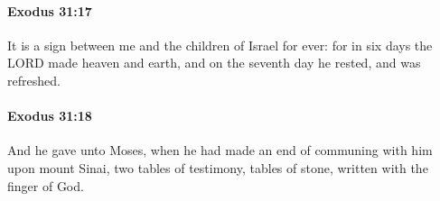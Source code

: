 		\paragraph{Exodus 31:17} %
			\label{EXODUS-31-17}

			It is a sign between me and the children of Israel for ever: for in six days the LORD made heaven and earth, and on the seventh day he rested, and was refreshed.


		\paragraph{Exodus 31:18} %
			\label{EXODUS-31-18}

			And he gave unto Moses, when he had made an end of communing with him upon mount Sinai, two tables of testimony, tables of stone, written with the finger of God.

